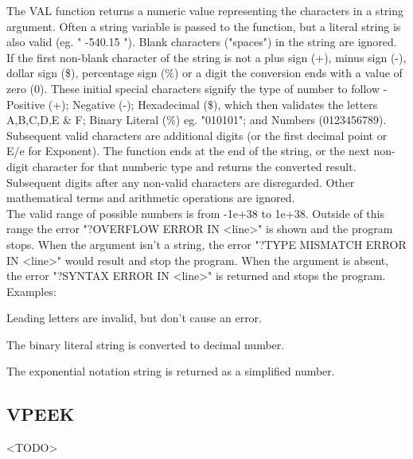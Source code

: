The {\ttfamily VAL} function returns a numeric value representing the
characters in a string argument.  Often a string variable is passed to the
function, but a literal string is also valid (eg. "  -540.15 "). Blank
characters ("spaces") in the string are ignored.  If the first non-blank
character of the string is not a plus sign (+), minus sign (-), dollar sign
(\$), percentage sign (\%) or a digit the conversion ends with a value of zero
(0).  These initial special characters signify the type of number to follow -
Positive (+); Negative (-); Hexadecimal (\$), which then validates the letters
A,B,C,D,E \& F; Binary Literal (\%) eg. "010101"; and Numbers (0123456789).
Subsequent valid characters are additional digits (or the first decimal point
or E/e for Exponent).  The function ends at the end of the string, or the next
non-digit character for that numberic type and returns the converted result.
Subsequent digits after any non-valid characters are disregarded.  Other
mathematical terms and arithmetic operations are ignored.\\

The valid range of possible numbers is from -1e+38 to 1e+38. Outside of this
range the error "?OVERFLOW ERROR IN <line>" is shown and the program stops.
When the argument isn't a string, the error "?TYPE MISMATCH ERROR IN <line>"
would result and stop the program.  When the argument is absent, the error
"?SYNTAX ERROR IN <line>" is returned and stops the program.\\

Examples:\\


Leading letters are invalid, but don't cause an error.\\


The binary literal string is converted to decimal number.\\


The exponential notation string is returned as a simplified number.\\


\subsection{VPEEK}

<TODO>

